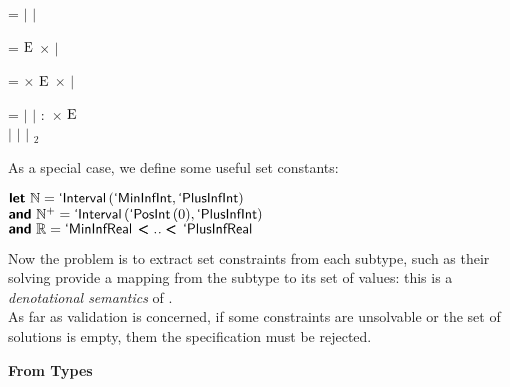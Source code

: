 \documentclass[12pt]{article}
\begin{document}
\begin{slide}
\noindent
{}  =
\ocamlconstr{[} 
$\mid$ \MinInfInt{}
$\mid$ \PlusInfInt \ocamlconstr{]}

\smallskip

\noindent
{}  = 
\ocamlconstr{[}\Cons{}  $\textnormal{E}$ $\times$ 
$\mid$ \Nil \ocamlconstr{]}

\noindent
{}  =
\ocamlconstr{[}\Bind{}  
$\times$ $\textnormal{E}$ $\times$  $\mid$ \Nil \ocamlconstr{]}

\smallskip

\noindent
{}  =
       \ocamlconstr{[} 
$\mid$ 
$\mid$ \wildcard\/ $\pmb{:}$ \wildcardof
            $\times$ $\textnormal{E}$\\
\hspace*{3mm}
$\mid$ 
$\mid$ 
$\mid$ $_{2}$\ocamlconstr{]}

\pagebreak

As a special case, we define some useful set constants:

\medskip

\noindent
$\textnormal{\textsf{\textbf{let}}} \,\, \mathbb{N} = \textnormal{\textsf{`Interval}} \, (\textnormal{\textsf{`MinInfInt}},
\textnormal{\textsf{`PlusInfInt}})$\\
$\textnormal{\textsf{\textbf{and}}} \,\, \mathbb{N}^{+} = \textnormal{\textsf{`Interval}} \, (\textnormal{\textsf{`PosInt}} \, (0),
\textnormal{\textsf{`PlusInfInt}})$\\
$\textnormal{\textsf{\textbf{and}}} \,\, \mathbb{R} = \textnormal{\textsf{`MinInfReal}} \, \pmb{<}
\textsc{..} \pmb{<} \, \textnormal{\textsf{`PlusInfReal}}$

\bigskip\bigskip\bigskip

Now the problem is to extract set constraints from each subtype, such
as their solving provide a mapping from the subtype to its set of
values: this is a \emph{denotational semantics} of \ASN.\\

As far as validation is concerned, if some constraints are unsolvable
or the set of solutions is empty, them the specification must be
rejected.

\pagebreak


\textbf{From Types}\\


\end{slide}
\end{document}
